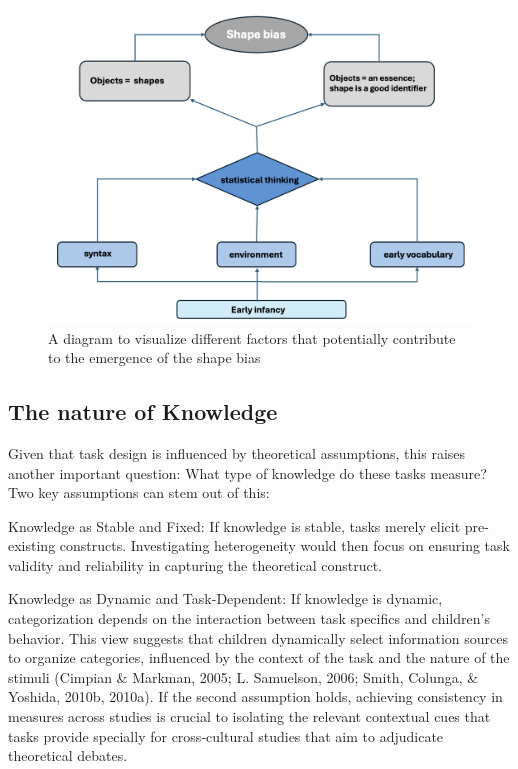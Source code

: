 \documentclass[10pt, letterpaper]{article}
\newenvironment{CodeChunk}{}{}
\begin{document}
\begin{CodeChunk}
\begin{figure}[tb]
\includegraphics[width=1\linewidth]{conceptual_diagram1} \caption[A diagram to visualize different factors that potentially contribute to the emergence of the shape bias]{A diagram to visualize different factors that potentially contribute to the emergence of the shape bias}\label{fig:flow_diagram }
\end{figure}
\end{CodeChunk}

\hypertarget{the-nature-of-knowledge}{%
\subsection{The nature of Knowledge}\label{the-nature-of-knowledge}}

Given that task design is influenced by theoretical assumptions, this
raises another important question: What type of knowledge do these tasks
measure? Two key assumptions can stem out of this:

Knowledge as Stable and Fixed: If knowledge is stable, tasks merely
elicit pre-existing constructs. Investigating heterogeneity would then
focus on ensuring task validity and reliability in capturing the
theoretical construct.

Knowledge as Dynamic and Task-Dependent: If knowledge is dynamic,
categorization depends on the interaction between task specifics and
children's behavior. This view suggests that children dynamically select
information sources to organize categories, influenced by the context of
the task and the nature of the stimuli (Cimpian \& Markman, 2005; L.
Samuelson, 2006; Smith, Colunga, \& Yoshida, 2010b, 2010a). If the
second assumption holds, achieving consistency in measures across
studies is crucial to isolating the relevant contextual cues that tasks
provide specially for cross-cultural studies that aim to adjudicate
theoretical debates.
\end{document}
